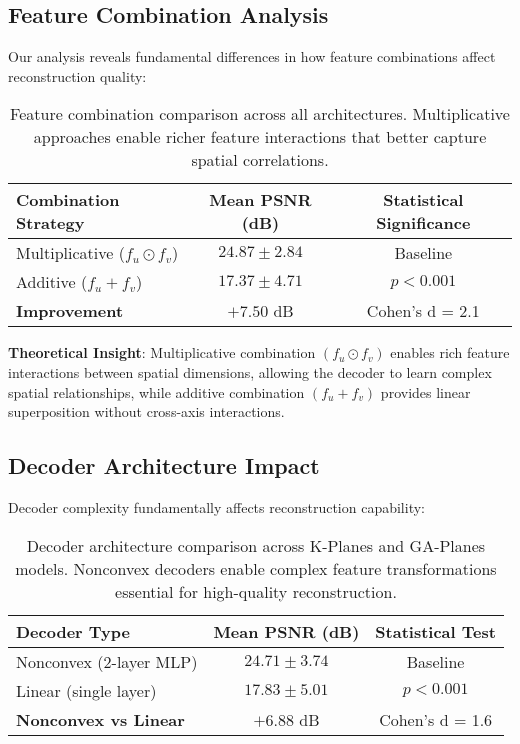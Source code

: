 \documentclass{article}
\begin{document}
\subsection{Feature Combination Analysis}

Our analysis reveals fundamental differences in how feature combinations affect reconstruction quality:

\begin{table}[t]
\centering
\small
\begin{tabular}{@{}lcc@{}}
\toprule
\textbf{Combination Strategy} & \textbf{Mean PSNR (dB)} & \textbf{Statistical Significance} \\
\midrule
Multiplicative ($f_u \odot f_v$) & $24.87 \pm 2.84$ & Baseline \\
Additive ($f_u + f_v$) & $17.37 \pm 4.71$ & $p < 0.001$ \\
\midrule
\textbf{Improvement} & $\mathbf{+7.50}$ dB & Cohen's d = 2.1 \\
\bottomrule
\end{tabular}
\caption{Feature combination comparison across all architectures. Multiplicative approaches enable richer feature interactions that better capture spatial correlations.}
\label{tab:combination_analysis}
\end{table}

\textbf{Theoretical Insight}: Multiplicative combination $(f_u \odot f_v)$ enables rich feature interactions between spatial dimensions, allowing the decoder to learn complex spatial relationships, while additive combination $(f_u + f_v)$ provides linear superposition without cross-axis interactions.

\subsection{Decoder Architecture Impact}

Decoder complexity fundamentally affects reconstruction capability:

\begin{table}[t]
\centering
\small
\begin{tabular}{@{}lcc@{}}
\toprule
\textbf{Decoder Type} & \textbf{Mean PSNR (dB)} & \textbf{Statistical Test} \\
\midrule
Nonconvex (2-layer MLP) & $24.71 \pm 3.74$ & Baseline \\
Linear (single layer) & $17.83 \pm 5.01$ & $p < 0.001$ \\
\midrule
\textbf{Nonconvex vs Linear} & $\mathbf{+6.88}$ dB & Cohen's d = 1.6 \\
\bottomrule
\end{tabular}
\caption{Decoder architecture comparison across K-Planes and GA-Planes models. Nonconvex decoders enable complex feature transformations essential for high-quality reconstruction.}
\label{tab:decoder_comparison}
\end{table}
\end{document}
